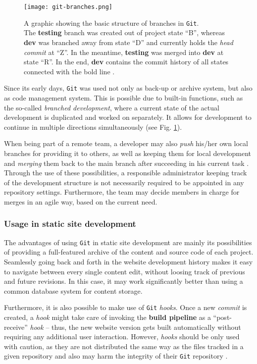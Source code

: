 \begin{figure} %
    \centering
    \texttt{[image: git-branches.png]}
    \caption{A graphic showing the basic structure of branches in \texttt{Git}.\\
    The \textbf{testing} branch was created out of project state ``B'', whereas \textbf{dev} was branched away from state ``D'' and currently holds the \emph{head commit} at ``Z''. In the meantime, \textbf{testing} was merged into \textbf{dev} at state ``R''. In the end, \textbf{dev} contains the commit history of all states connected with the bold line \cite[p. 92f]{loeliger2012version}.}
    \label{fig:git-branches}
\end{figure}
%

Since its early days, \texttt{Git} was used not only as back-up or archive system, but also as code management system. This is possible due to built-in functions, such as the so-called \emph{branched development}, where a current state of the actual development is duplicated and worked on separately. It allows for development to continue in multiple directions simultaneously \cite[89]{loeliger2012version} (see Fig. \ref{fig:git-branches}).

When being part of a remote team, a developer may also \emph{push} his/her own local branches for providing it to others, as well as keeping them for local development and \emph{merging} them back to the main branch after succeeding in his current task \cite[207]{dhillon2016}. Through the use of these possibilities, a responsible administrator keeping track of the development structure is not necessarily required to be appointed in any repository settings. Furthermore, the team may decide members in charge for merges in an agile way, based on the current need.

\subsubsection{Usage in static site development}
The advantages of using \texttt{Git} in static site development are mainly its possibilities of providing a full-featured archive of the content and source code of each project. Seamlessly going back and forth in the website development history makes it easy to navigate between every single content edit, without loosing track of previous and future revisions. In this case, it may work significantly better than using a common database system for content storage.

Furthermore, it is also possible to make use of \texttt{Git} \emph{hooks}. Once a new \emph{commit} is created, a \emph{hook} might take care of invoking the \textbf{build pipeline} as a ``post-receive'' \emph{hook} -- thus, the new website version gets built automatically without requiring any additional user interaction. However, \emph{hooks} should be only used with caution, as they are not distributed the same way as the files tracked in a given repository and also may harm the integrity of their \texttt{Git} repository \cite[p. 285f]{loeliger2012version}.


